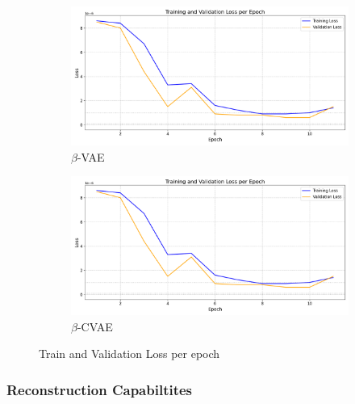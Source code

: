 \begin{figure}[!h]
  \begin{subfigure}[t]{.6\textwidth}
    \centering
    \includegraphics[width=\linewidth]{figures/losses/ae.png}
    \caption{$\beta$-VAE}
  \end{subfigure}
  \hfill
  \begin{subfigure}[t]{.6\textwidth}
    \centering
    \includegraphics[width=\linewidth]{figures/losses/ae.png}
    \caption{$\beta$-CVAE}
  \end{subfigure}
  \label{fig:losses}
  \caption{Train and Validation Loss per epoch}
\end{figure}



\subsubsection{Reconstruction Capabiltites}

